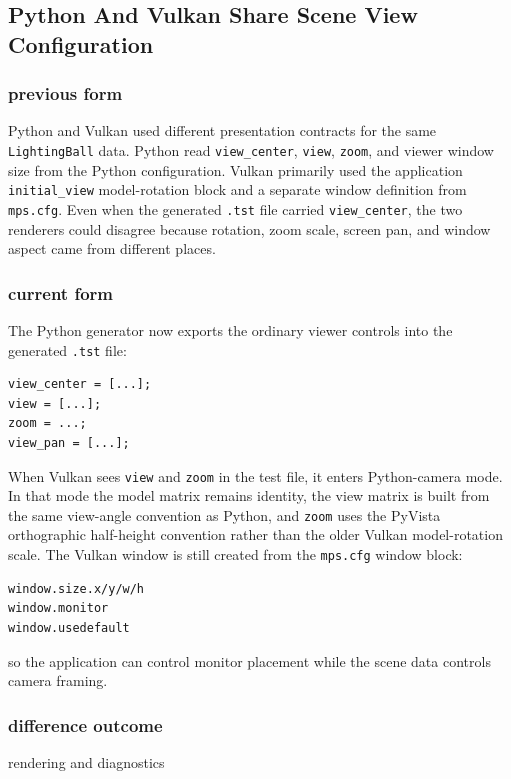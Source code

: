 \subsection{Python And Vulkan Share Scene View Configuration}

\subsubsection{previous form}

Python and Vulkan used different presentation contracts for the same
\texttt{LightingBall} data.  Python read \texttt{view\_center},
\texttt{view}, \texttt{zoom}, and viewer window size from the Python
configuration.  Vulkan primarily used the application
\texttt{initial\_view} model-rotation block and a separate window definition
from \texttt{mps.cfg}.  Even when the generated \texttt{.tst} file carried
\texttt{view\_center}, the two renderers could disagree because rotation,
zoom scale, screen pan, and window aspect came from different places.

\subsubsection{current form}

The Python generator now exports the ordinary viewer controls into the
generated \texttt{.tst} file:
\begin{verbatim}
view_center = [...];
view = [...];
zoom = ...;
view_pan = [...];
\end{verbatim}

When Vulkan sees \texttt{view} and \texttt{zoom} in the test file, it enters
Python-camera mode.  In that mode the model matrix remains identity, the view
matrix is built from the same view-angle convention as Python, and
\texttt{zoom} uses the PyVista orthographic half-height convention rather
than the older Vulkan model-rotation scale.  The Vulkan window is still
created from the \texttt{mps.cfg} window block:
\begin{verbatim}
window.size.x/y/w/h
window.monitor
window.usedefault
\end{verbatim}
so the application can control monitor placement while the scene data controls
camera framing.

\subsubsection{difference outcome}

rendering and diagnostics

